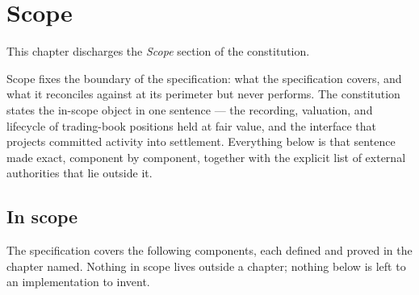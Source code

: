 \section{Scope}\label{ch:scope}

This chapter discharges the \emph{Scope} section of the constitution.

Scope fixes the boundary of the specification: what the specification covers, and what it
reconciles against at its perimeter but never performs. The constitution states the
in-scope object in one sentence --- the recording, valuation, and lifecycle of
trading-book positions held at fair value, and the interface that projects committed
activity into settlement. Everything below is that sentence made exact, component by
component, together with the explicit list of external authorities that lie outside it.

\subsection{In scope}

The specification covers the following components, each defined and proved in the chapter
named. Nothing in scope lives outside a chapter; nothing below is left to an implementation
to invent.

